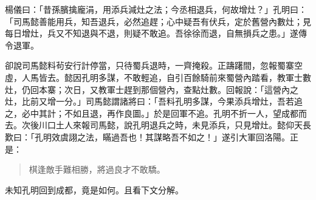 楊儀曰：「昔孫臏擒龐涓，用添兵減灶之法；今丞相退兵，何故增灶？」孔明曰：「司馬懿善能用兵，知吾退兵，必然追趕；心中疑吾有伏兵，定於舊營內數灶；見每日增灶，兵又不知退與不退，則疑不敢追。吾徐徐而退，自無損兵之患。」遂傳令退軍。

卻說司馬懿料茍安行計停當，只待蜀兵退時，一齊掩殺。正躊躇間，忽報蜀寨空虛，人馬皆去。懿因孔明多謀，不敢輕追，自引百餘騎前來蜀營內踏看，教軍士數灶，仍回本寨；次日，又教軍士趕到那個營內，查點灶數。回報說：「這營內之灶，比前又增一分。」司馬懿謂諸將曰：「吾料孔明多謀，今果添兵增灶，吾若追之，必中其計；不如且退，再作良圖。」於是回軍不追。孔明不折一人，望成都而去。次後川口土人來報司馬懿，說孔明退兵之時，未見添兵，只見增灶。懿仰天長歎曰：「孔明效虞詡之法，瞞過吾也！其謀略吾不如之！」遂引大軍回洛陽。正是：

\begin{quote}
棋逢敵手難相勝，將過良才不敢驕。
\end{quote}

未知孔明回到成都，竟是如何。且看下文分解。
